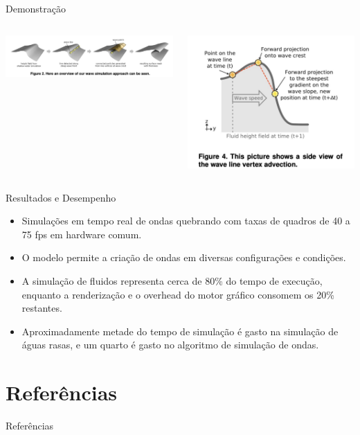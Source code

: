 \documentclass[aspectratio=169,xcolor=table]{beamer}
\begin{document}
\begin{frame}{Demonstração}
    \begin{columns}
        \centering
        \includegraphics[width=\textwidth]{imgs/real-time-1.png}
        
        \centering
        \includegraphics[width=\textwidth]{imgs/real-time-2.png}
    \end{columns}
\end{frame}

\begin{frame}{Resultados e Desempenho}
    \begin{itemize}
        \item Simulações em tempo real de ondas quebrando com taxas de quadros de 40 a 75 fps em hardware comum.
        \item O modelo permite a criação de ondas em diversas configurações e condições.
        \item A simulação de fluidos representa cerca de 80\% do tempo de execução, enquanto a renderização e o overhead do motor gráfico consomem os 20\% restantes.
        \item Aproximadamente metade do tempo de simulação é gasto na simulação de águas rasas, e um quarto é gasto no algoritmo de simulação de ondas.
    \end{itemize}
\end{frame}

\section{Referências}
\begin{frame}[allowframebreaks]{Referências}
    \nocite{*}
    
    
\end{frame}
\end{document}
